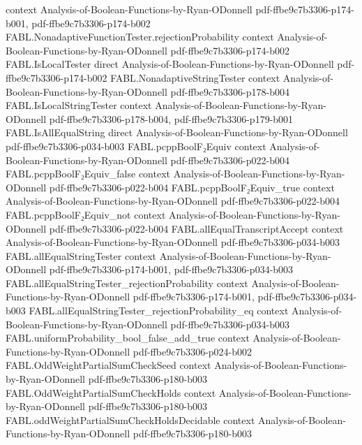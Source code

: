 \begin{theorem}
  {context}
  {Analysis-of-Boolean-Functions-by-Ryan-ODonnell}
  {pdf-ffbe9c7b3306-p174-b001,
    pdf-ffbe9c7b3306-p174-b002}
\proofstep
  {FABL.NonadaptiveFunctionTester.rejectionProbability}
  {context}
  {Analysis-of-Boolean-Functions-by-Ryan-ODonnell}
  {pdf-ffbe9c7b3306-p174-b002}
\proofstep
  {FABL.IsLocalTester}
  {direct}
  {Analysis-of-Boolean-Functions-by-Ryan-ODonnell}
  {pdf-ffbe9c7b3306-p174-b002}
\proofstep
  {FABL.NonadaptiveStringTester}
  {context}
  {Analysis-of-Boolean-Functions-by-Ryan-ODonnell}
  {pdf-ffbe9c7b3306-p178-b004}
\proofstep
  {FABL.IsLocalStringTester}
  {context}
  {Analysis-of-Boolean-Functions-by-Ryan-ODonnell}
  {pdf-ffbe9c7b3306-p178-b004,
    pdf-ffbe9c7b3306-p179-b001}
\proofstep
  {FABL.IsAllEqualString}
  {direct}
  {Analysis-of-Boolean-Functions-by-Ryan-ODonnell}
  {pdf-ffbe9c7b3306-p034-b003}
\proofstep
  {FABL.pcppBoolF₂Equiv}
  {context}
  {Analysis-of-Boolean-Functions-by-Ryan-ODonnell}
  {pdf-ffbe9c7b3306-p022-b004}
\proofstep
  {FABL.pcppBoolF₂Equiv_false}
  {context}
  {Analysis-of-Boolean-Functions-by-Ryan-ODonnell}
  {pdf-ffbe9c7b3306-p022-b004}
\proofstep
  {FABL.pcppBoolF₂Equiv_true}
  {context}
  {Analysis-of-Boolean-Functions-by-Ryan-ODonnell}
  {pdf-ffbe9c7b3306-p022-b004}
\proofstep
  {FABL.pcppBoolF₂Equiv_not}
  {context}
  {Analysis-of-Boolean-Functions-by-Ryan-ODonnell}
  {pdf-ffbe9c7b3306-p022-b004}
\proofstep
  {FABL.allEqualTranscriptAccept}
  {context}
  {Analysis-of-Boolean-Functions-by-Ryan-ODonnell}
  {pdf-ffbe9c7b3306-p034-b003}
\proofstep
  {FABL.allEqualStringTester}
  {context}
  {Analysis-of-Boolean-Functions-by-Ryan-ODonnell}
  {pdf-ffbe9c7b3306-p174-b001,
    pdf-ffbe9c7b3306-p034-b003}
\proofstep
  {FABL.allEqualStringTester_rejectionProbability}
  {context}
  {Analysis-of-Boolean-Functions-by-Ryan-ODonnell}
  {pdf-ffbe9c7b3306-p174-b001,
    pdf-ffbe9c7b3306-p034-b003}
\proofstep
  {FABL.allEqualStringTester_rejectionProbability_eq}
  {context}
  {Analysis-of-Boolean-Functions-by-Ryan-ODonnell}
  {pdf-ffbe9c7b3306-p034-b003}
\proofstep
  {FABL.uniformProbability_bool_false_add_true}
  {context}
  {Analysis-of-Boolean-Functions-by-Ryan-ODonnell}
  {pdf-ffbe9c7b3306-p024-b002}
\proofstep
  {FABL.OddWeightPartialSumCheckSeed}
  {context}
  {Analysis-of-Boolean-Functions-by-Ryan-ODonnell}
  {pdf-ffbe9c7b3306-p180-b003}
\proofstep
  {FABL.OddWeightPartialSumCheckHolds}
  {context}
  {Analysis-of-Boolean-Functions-by-Ryan-ODonnell}
  {pdf-ffbe9c7b3306-p180-b003}
\proofstep
  {FABL.oddWeightPartialSumCheckHoldsDecidable}
  {context}
  {Analysis-of-Boolean-Functions-by-Ryan-ODonnell}
  {pdf-ffbe9c7b3306-p180-b003}

\end{theorem}
